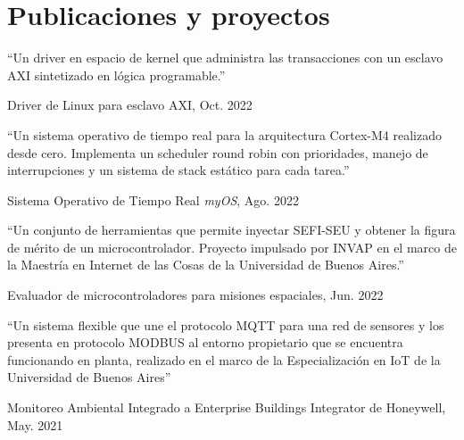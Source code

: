 \section{Publicaciones y proyectos}

\newcommand{\pub}[5]{
	\parbox[t][][t]{\linewidth}{%
		\begin{small}
		\parbox{\linewidth}{{``#4''}}
		\smallbreak
		\parbox{\linewidth}{{#2}, {#1}}
		\parbox{\linewidth}{{\href{https://doi.org/#3}{#3}}}
		\end{small}
	}
	\bigbreak
	\smallskip
}

\pub{Oct. 2022}{Driver de Linux para esclavo AXI}{}{Un driver en espacio de kernel que administra las transacciones con un esclavo AXI sintetizado en lógica programable.}{
}

\pub{Ago. 2022}{Sistema Operativo de Tiempo Real \emph{myOS}}{}{Un sistema operativo de tiempo real para la arquitectura Cortex-M4 realizado desde cero. Implementa un scheduler round robin con prioridades, manejo de interrupciones y un sistema de stack estático para cada tarea.}{
}

\pub{Jun. 2022}{Evaluador de microcontroladores para misiones espaciales}{}{Un conjunto de herramientas que permite inyectar SEFI-SEU y obtener la figura de mérito de un microcontrolador. Proyecto impulsado por INVAP en el marco de la Maestría en Internet de las Cosas de la Universidad de Buenos Aires.}{
}

\pub{May. 2021}{Monitoreo Ambiental Integrado a Enterprise Buildings Integrator de Honeywell}{}{Un sistema flexible que une el protocolo MQTT para una red de sensores y los presenta en protocolo MODBUS al entorno propietario que se encuentra funcionando en planta, realizado en el marco de la Especialización en IoT de la Universidad de Buenos Aires}{
}


